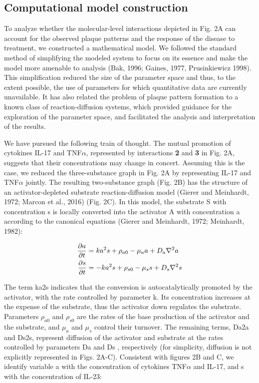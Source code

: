 \subsection{Computational model construction}
To analyze whether the molecular-level interactions depicted in Fig. 2A can account for the observed plaque patterns and the response of the disease to treatment, we constructed a mathematical model. We followed the standard method of simplifying the modeled system to focus on its essence and make the model more amenable to analysis (Bak, 1996; Gaines, 1977, Prusinkiewicz 1998). This simplification reduced the size of the parameter space and thus, to the extent possible, the use of parameters for which quantitative data are currently unavailable. It has also related the problem of plaque pattern formation to a known class of reaction-diffusion systems, which provided guidance for the exploration of the parameter space, and facilitated the analysis and interpretation of the results.
 
We have pursued the following train of thought. The mutual promotion of cytokines IL-17 and TNF$\alpha$, represented by interactions \textbf{2} and \textbf{3} in Fig. 2A, suggests that their concentrations may change in concert. Assuming this is the case, we reduced the three-substance graph in Fig. 2A by representing IL-17 and TNF$\alpha$ jointly. The resulting two-substance graph (Fig. 2B) has the structure of an activator-depleted substrate reaction-diffusion model (Gierer and Meinhardt, 1972; Marcon et al., 2016) (Fig. 2C). In this model, the substrate S with concentration s is locally converted into the activator A with concentration a according to the canonical equations (Gierer and Meinhardt, 1972; Meinhardt, 1982):

\begin{equation}
	\begin{aligned} \label{eq:ahPsoriasis}
	\frac{\partial a}{\partial t} &= ka^2s+\rho_{a0}-\mu_a a + D_a \nabla^2 a \\
	\frac{\partial s}{\partial t} &= -ka^2s+\rho_{s0}-\mu_s s + D_s \nabla^2 s
	\end{aligned}
\end{equation}

The term ka2s indicates that the conversion is autocatalytically promoted by the activator, with the rate controlled by parameter k. Its concentration increases at the expense of the substrate, thus the activator down regulates the substrate. Parameters $\rho_{a0}$ and $\rho_{s0}$ are the rates of the base production of the activator and the substrate, and $\mu_a$ and $\mu_s$ control their turnover. The remaining terms, Da2a and Ds2s, represent diffusion of the activator and substrate at the rates controlled by parameters Da and Ds , respectively (for simplicity, diffusion is not explicitly represented in Figs. 2A-C). Consistent with figures 2B and C, we identify variable a with the concentration of cytokines TNF$\alpha$ and IL-17, and s with the concentration of IL-23:

